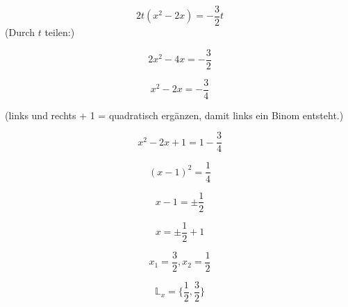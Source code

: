 



\usepackage{cancel}
\renewcommand{\metaHeaderLine}{Musterlösung}
\renewcommand{\arbeitsblattTitel}{Marthaler S. 181 Aufg. 7. e)}

\arbeitsblattHeader{}

$$2t(x^2-2x)=-\frac{3}{2}t$$
(Durch $t$ teilen:)

$$2x^2-4x=-\frac{3}{2}$$

$$x^2-2x=-\frac{3}{4} $$

(links und rechts + 1 = quadratisch ergänzen, damit links ein Binom entsteht.)

$$x^2-2x+1 = 1 -\frac{3}{4}$$

$$(x-1)^2=\frac{1}{4}$$

$$x-1 = \pm \frac{1}{2}$$

$$x=\pm \frac{1}{2}+ 1 $$

$$x_1 = \frac{3}{2}, x_2 = \frac{1}{2}  $$

$$\mathbb{L}_x = \{\frac{1}{2}, \frac{3}{2}\}$$

